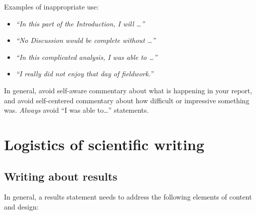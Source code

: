 \documentclass[
]{book}
\providecommand{\tightlist}{%
  \setlength{\itemsep}{0pt}\setlength{\parskip}{0pt}}
\begin{document}
Examples of inappropriate use:

\begin{itemize}
\tightlist
\item
  \emph{``In this part of the Introduction, I will \ldots{}''}\\
\item
  \emph{``No Discussion would be complete without \ldots{}''}\\
\item
  \emph{``In this complicated analysis, I was able to \ldots{}''}
\item
  \emph{``I really did not enjoy that day of fieldwork.''}
\end{itemize}

In general, avoid self-aware commentary about what is happening in your report, and avoid self-centered commentary about how difficult or impressive something was. \emph{Always} avoid ``I was able to\ldots{}'' statements.

\hypertarget{logistics-of-scientific-writing}{%
\section*{Logistics of scientific writing}\label{logistics-of-scientific-writing}}

\hypertarget{writing-about-results}{%
\subsection*{Writing about results}\label{writing-about-results}}

In general, a results statement needs to address the following elements of content and design:
\end{document}
